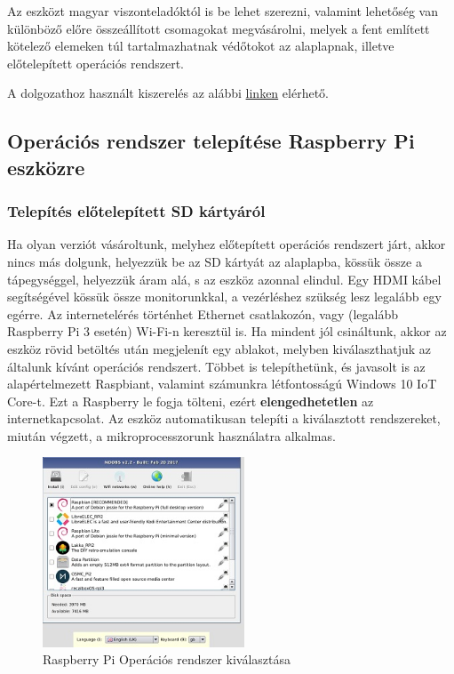 \documentclass[a4paper,12pt]{report}
\begin{document}
    Az eszközt magyar viszonteladóktól is be lehet szerezni, valamint lehetőség van különböző előre összeállított csomagokat megvásárolni,
     melyek a fent említett kötelező elemeken túl tartalmazhatnak védőtokot az alaplapnak, illetve előtelepített operációs rendszert.

    A dolgozathoz használt kiszerelés az alábbi \href{https://malnapc.hu/yis/raspberry-pi-3-quad-core-suli-kit}{linken} elérhető.

\subsection{Operációs rendszer telepítése Raspberry Pi eszközre}

\subsubsection{Telepítés előtelepített SD kártyáról}
    Ha olyan verziót vásároltunk, melyhez előtepített operációs rendszert járt, akkor nincs más dolgunk, helyezzük be az SD kártyát
    az alaplapba, kössük össze a tápegységgel, helyezzük áram alá, s az eszköz azonnal elindul. Egy HDMI kábel segítségével kössük össze
    monitorunkkal, a vezérléshez szükség lesz legalább egy egérre. Az internetelérés történhet Ethernet csatlakozón, vagy (legalább Raspberry
    Pi 3 esetén) Wi-Fi-n keresztül is. Ha mindent jól csináltunk, akkor az eszköz rövid betöltés után megjelenít egy ablakot,
    melyben kiválaszthatjuk az általunk kívánt operációs rendszert. Többet is telepíthetünk, és javasolt is az alapértelmezett Raspbiant,
    valamint számunkra létfontosságú Windows 10 IoT Core-t. Ezt a Raspberry le fogja tölteni, ezért \textbf{elengedhetetlen} az internetkapcsolat.
    Az eszköz automatikusan telepíti a kiválasztott rendszereket, miután végzett, a mikroprocesszorunk használatra alkalmas.

\begin{figure}[h!]
    \hspace{5cm}
    \includegraphics[width=6cm]{images/rpi_os_setup.jpg}
    \caption{Raspberry Pi Operációs rendszer kiválasztása}
    \label{fig: Raspberry Pi Operációs rendszer}
\end{figure}
\end{document}
